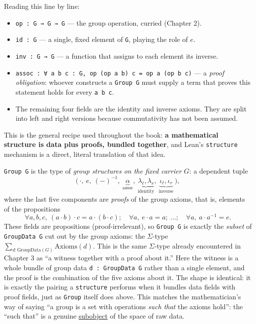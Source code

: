 Reading this line by line:

\begin{itemize}
\tightlist
\item
  \texttt{op : G → G → G} --- the group operation, curried (Chapter 2).
\item
  \texttt{id : G} --- a single, fixed element of \texttt{G}, playing the role of \(e\).
\item
  \texttt{inv : G → G} --- a function that assigns to each element its inverse.
\item
  \texttt{assoc : ∀ a b c : G, op (op a b) c = op a (op b c)} --- a \emph{proof obligation}: whoever constructs a \texttt{Group G} must supply a term that proves this statement holds for every \texttt{a b c}.
\item
  The remaining four fields are the identity and inverse axioms. They are split into left and right versions because commutativity has not been assumed.
\end{itemize}

This is the general recipe used throughout the book: \textbf{a mathematical structure is data plus proofs, bundled together}, and Lean's \texttt{structure} mechanism is a direct, literal translation of that idea.

\begin{mathreading}

\texttt{Group G} is the type of \emph{group structures on the fixed carrier \(G\)}: a dependent tuple \[
\Big(\,\cdot,\ e,\ (-)^{-1},\ \underbrace{\alpha}_{\text{assoc}},\
\underbrace{\lambda_\ell,\lambda_r}_{\text{identity}},\
\underbrace{\iota_\ell,\iota_r}_{\text{inverse}}\,\Big),
\] where the last five components are \emph{proofs} of the group axioms, that is, elements of the propositions \[
\forall a,b,c,\ (a\cdot b)\cdot c = a\cdot(b\cdot c);\quad
\forall a,\ e\cdot a = a;\ \ldots;\quad \forall a,\ a\cdot a^{-1}=e.
\] These fields are propositions (proof-irrelevant), so \texttt{Group G} is exactly the \emph{subset} of \texttt{GroupData G} cut out by the group axioms: the \(\Sigma\)-type \(\sum_{d : \mathrm{GroupData}(G)} \mathrm{Axioms}(d)\). This is the same \(\Sigma\)-type already encountered in Chapter 3 as ``a witness together with a proof about it.'' Here the witness is a whole bundle of group data \texttt{d : GroupData G} rather than a single element, and the proof is the combination of the five axioms about it. The shape is identical: it is exactly the pairing a \texttt{structure} performs when it bundles data fields with proof fields, just as \texttt{Group} itself does above. This matches the mathematician's way of saying ``a group is a set with operations \emph{such that} the axioms hold'': the ``such that'' is a genuine \hyperref[sec:01-basics:04-terminology:1]{subobject} of the space of raw data.

\end{mathreading}

